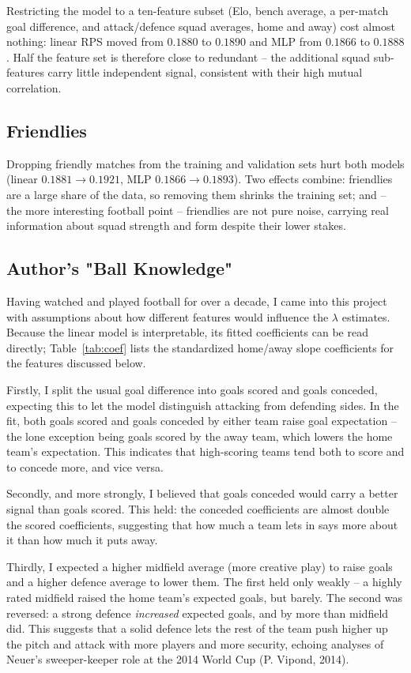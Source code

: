 \documentclass{article}
\begin{document}
Restricting the model to a ten-feature subset (Elo, bench average, a per-match goal difference, and attack/defence squad averages, home and away) cost almost nothing: linear RPS moved from $0.1880$ to $0.1890$ and MLP from $0.1866$ to $0.1888$. Half the feature set is therefore close to redundant -- the additional squad sub-features carry little independent signal, consistent with their high mutual correlation.

\subsection{Friendlies}

Dropping friendly matches from the training and validation sets hurt both models (linear $0.1881 \to 0.1921$, MLP $0.1866 \to 0.1893$). Two effects combine: friendlies are a large share of the data, so removing them shrinks the training set; and -- the more interesting football point -- friendlies are not pure noise, carrying real information about squad strength and form despite their lower stakes.

\subsection{Author's "Ball Knowledge"}

Having watched and played football for over a decade, I came into this project with assumptions about how different features would influence the $\lambda$ estimates. Because the linear model is interpretable, its fitted coefficients can be read directly; Table~\ref{tab:coef} lists the standardized home/away slope coefficients for the features discussed below.

Firstly, I split the usual goal difference into goals scored and goals conceded, expecting this to let the model distinguish attacking from defending sides. In the fit, both goals scored and goals conceded by either team raise goal expectation -- the lone exception being goals scored by the away team, which lowers the home team's expectation. This indicates that high-scoring teams tend both to score and to concede more, and vice versa.

Secondly, and more strongly, I believed that goals conceded would carry a better signal than goals scored. This held: the conceded coefficients are almost double the scored coefficients, suggesting that how much a team lets in says more about it than how much it puts away.

Thirdly, I expected a higher midfield average (more creative play) to raise goals and a higher defence average to lower them. The first held only weakly -- a highly rated midfield raised the home team's expected goals, but barely. The second was reversed: a strong defence \emph{increased} expected goals, and by more than midfield did. This suggests that a solid defence lets the rest of the team push higher up the pitch and attack with more players and more security, echoing analyses of Neuer's sweeper-keeper role at the 2014 World Cup (P. Vipond, 2014).
\end{document}
